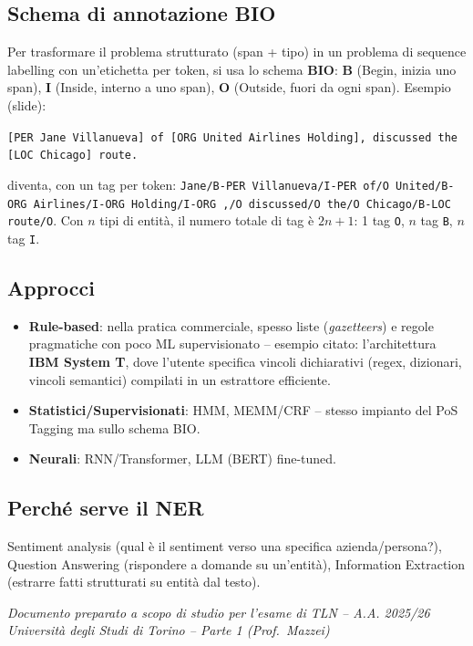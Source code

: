 \documentclass[12pt,a4paper]{article}
\begin{document}
\subsection{Schema di annotazione BIO}

Per trasformare il problema strutturato (span + tipo) in un problema di sequence labelling con un'etichetta per token, si usa lo schema \textbf{BIO}: \textbf{B} (Begin, inizia uno span), \textbf{I} (Inside, interno a uno span), \textbf{O} (Outside, fuori da ogni span). Esempio (slide):
\begin{center}
\texttt{[PER Jane Villanueva] of [ORG United Airlines Holding], discussed the [LOC Chicago] route.}
\end{center}
diventa, con un tag per token: \texttt{Jane/B-PER Villanueva/I-PER of/O United/B-ORG Airlines/I-ORG Holding/I-ORG ,/O discussed/O the/O Chicago/B-LOC route/O}. Con $n$ tipi di entità, il numero totale di tag è $2n+1$: 1 tag \texttt{O}, $n$ tag \texttt{B}, $n$ tag \texttt{I}.

\subsection{Approcci}

\begin{itemize}[leftmargin=1.5em]
  \item \textbf{Rule-based}: nella pratica commerciale, spesso liste (\emph{gazetteers}) e regole pragmatiche con poco ML supervisionato -- esempio citato: l'architettura \textbf{IBM System T}, dove l'utente specifica vincoli dichiarativi (regex, dizionari, vincoli semantici) compilati in un estrattore efficiente.
  \item \textbf{Statistici/Supervisionati}: HMM, MEMM/CRF -- stesso impianto del PoS Tagging ma sullo schema BIO.
  \item \textbf{Neurali}: RNN/Transformer, LLM (BERT) fine-tuned.
\end{itemize}

\subsection{Perché serve il NER}

Sentiment analysis (qual è il sentiment verso una specifica azienda/persona?), Question Answering (rispondere a domande su un'entità), Information Extraction (estrarre fatti strutturati su entità dal testo).

\vfill
\begin{center}
\color{darkgray}\small\itshape
Documento preparato a scopo di studio per l'esame di TLN -- A.A. 2025/26\\
Università degli Studi di Torino -- Parte 1 (Prof.\ Mazzei)
\end{center}
\end{document}

